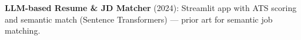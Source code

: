 \item \textbf{LLM-based Resume \& JD Matcher} (2024): Streamlit app with ATS scoring and semantic match (Sentence Transformers) --- prior art for semantic job matching.
